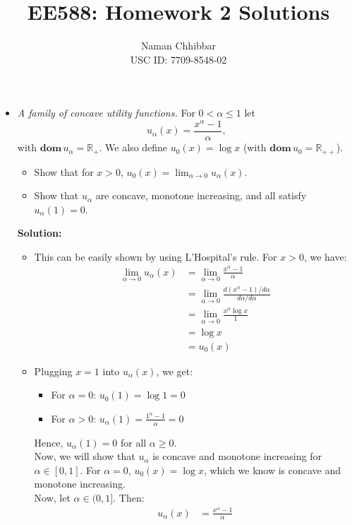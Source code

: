 \documentclass{article}
\title{EE588: Homework 2 Solutions}
\author{
  Naman Chhibbar \\
  USC ID: 7709-8548-02
}
\date{}
\begin{document}
\maketitle

\begin{itemize}
  \item[3.15] \textit{A family of concave utility functions.} For $0 < \alpha \le 1$ let
  \[ u_\alpha(x) = \frac{x^\alpha - 1}{\alpha}, \]
  with $\mathbf{dom} \, u_\alpha = \mathbb{R}_+$.
  We also define $u_0(x) = \log x$ (with $\mathbf{dom} \, u_0 = \mathbb{R}_{++}$).
  \begin{itemize}
    \item[(a)] Show that for $x > 0$, $u_0(x) = \lim_{\alpha \to 0} u_\alpha(x)$.
    \item[(b)] Show that $u_\alpha$ are concave, monotone increasing, and all satisfy $u_\alpha(1) = 0$.
  \end{itemize}
  \textbf{Solution:}
  \begin{itemize}
    \item[(a)] This can be easily shown by using L'Hospital's rule. For $x > 0$, we have:
    \begin{align*}
      \lim_{\alpha \to 0} u_\alpha(x) &= \lim_{\alpha \to 0} \frac{x^\alpha - 1}{\alpha} \\
      &= \lim_{\alpha \to 0} \frac{d(x^\alpha - 1)/d\alpha}{d\alpha/d\alpha} \\
      &= \lim_{\alpha \to 0} \frac{x^\alpha \log x}{1} \\
      &= \log x \\
      &= u_0(x)
    \end{align*}
    \item[(b)] Plugging $x = 1$ into $u_\alpha(x)$, we get:
    \begin{itemize}
      \item For $\alpha = 0$: $u_0(1) = \log 1 = 0$
      \item For $\alpha > 0$: $u_\alpha(1) = \frac{1^\alpha - 1}{\alpha} = 0$
    \end{itemize}
    Hence, $u_\alpha(1) = 0$ for all $\alpha \ge 0$. \\
    Now, we will show that $u_\alpha$ is concave and monotone increasing for $\alpha \in [0, 1]$.
    For $\alpha = 0$, $u_0(x) = \log x$, which we know is concave and monotone increasing. \\
    Now, let $\alpha \in (0, 1]$. Then:
    \begin{align*}
      u_\alpha(x) &= \frac{x^\alpha - 1}{\alpha} \\

\end{align*}
\end{itemize}
\end{itemize}
\end{document}
